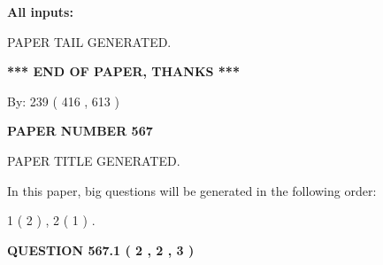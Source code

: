 \documentclass{ctexart}
\begin{document}
   
   
   
\noindent{}
   
   
   
   
\noindent\vspace{0.1in}\hspace{-0.08in} {\textbf{\Large{All inputs: }}}
   
   
   
   
   
   
 \vspace{0.2in}
 
   
   
\vspace{2.0in} PAPER TAIL GENERATED.
   
   
   
   
\vspace{1.0in} 
{\textbf{\large{ *** END OF PAPER, THANKS *** }}} 
   
   
\hspace{1.0in} By: 
 239 ( 416 ,  613 )
   
   
   
   
\newpage 
\setcounter{page}{ 
   567001 } 
   
   
   
   
 {\textbf{ \Large{ PAPER NUMBER  567  }}}
   
   
\vspace{0.2in}
   
   
   
   
   
   
   
   
 \vspace{0.2in}
 
 
 
 
   
   
 PAPER TITLE GENERATED.
   
   
   
\vspace{0.2in}
   
In this paper, big questions will be generated in the following order: 
   
   
   1 ( 2 )
 ,
   2 ( 1 )
 .
  
\vspace{0.2in}
  
{\textbf{\Large{QUESTION
567.1 
 ( 2 , 2 , 3 )
}}}
  
\end{document}
